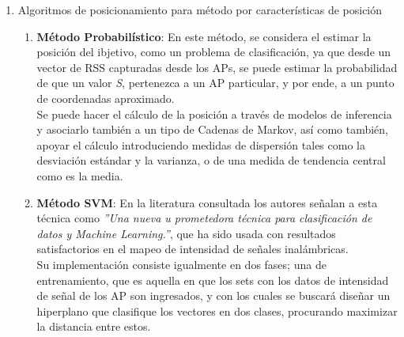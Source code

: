 \begin{itemize}
{\begin{enumerate}
        \item{Algoritmos de posicionamiento para método por características de posición}\\
        
            \begin{enumerate}
                \item {\textbf{Método Probabilístico}: En este método, se considera el estimar la posición del ibjetivo, como un problema de clasificación, ya que desde un vector de RSS capturadas desde los APs, se puede estimar la probabilidad de que un valor \textit{S}, pertenezca a un AP particular, y por ende, a un punto de coordenadas aproximado. \\
                
                Se puede hacer el cálculo de la posición a través de modelos de inferencia y asociarlo también a un tipo de Cadenas de Markov, así como también, apoyar el cálculo introduciendo medidas de dispersión tales como la desviación estándar y la varianza, o de una medida de tendencia central como es la media.\\
                }
                
                \clearpage 
                
                \item{\textbf{Método \ac{SVM}}: \label{SVM} En la literatura consultada \cite{7} los autores señalan a esta técnica como \textit{''Una nueva u prometedora técnica para clasificación de datos y Machine Learning.''}, que ha sido usada con resultados satisfactorios en el mapeo de intensidad de señales inalámbricas.\\
                
                Su implementación consiste igualmente en dos fases; una de entrenamiento, que es aquella en que los sets con los datos de  intensidad de señal de los AP son ingresados, y con los cuales se buscará diseñar un hiperplano que clasifique los vectores en dos clases, procurando maximizar la distancia entre estos.\\
                
}
\end{enumerate}
\end{enumerate}}
\end{itemize}
